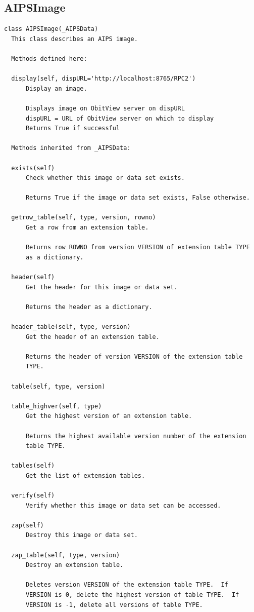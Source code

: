 \documentclass[11pt]{report}
\begin{document}
\subsection{AIPSImage}
\begin{verbatim}
class AIPSImage(_AIPSData)
  This class describes an AIPS image.
  
  Methods defined here:

  display(self, dispURL='http://localhost:8765/RPC2')
      Display an image.
      
      Displays image on ObitView server on dispURL
      dispURL = URL of ObitView server on which to display
      Returns True if successful

  Methods inherited from _AIPSData:
  
  exists(self)
      Check whether this image or data set exists.
      
      Returns True if the image or data set exists, False otherwise.
  
  getrow_table(self, type, version, rowno)
      Get a row from an extension table.
      
      Returns row ROWNO from version VERSION of extension table TYPE
      as a dictionary.
  
  header(self)
      Get the header for this image or data set.
      
      Returns the header as a dictionary.
  
  header_table(self, type, version)
      Get the header of an extension table.
      
      Returns the header of version VERSION of the extension table
      TYPE.
  
  table(self, type, version)
  
  table_highver(self, type)
      Get the highest version of an extension table.
      
      Returns the highest available version number of the extension
      table TYPE.
  
  tables(self)
      Get the list of extension tables.
  
  verify(self)
      Verify whether this image or data set can be accessed.
  
  zap(self)
      Destroy this image or data set.
  
  zap_table(self, type, version)
      Destroy an extension table.
      
      Deletes version VERSION of the extension table TYPE.  If
      VERSION is 0, delete the highest version of table TYPE.  If
      VERSION is -1, delete all versions of table TYPE.
  


\end{verbatim}
\end{document}
